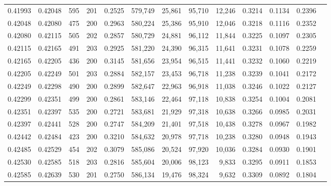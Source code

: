 \begin{tabular}{rrrrrrrrrrrrr}
0.41993 & 0.42048 &   595 & 201 &                                     0.2525 & 579,749 &  25,861 &  95,710 &  12,246 & 0.3214 & 0.1134 & 0.2396 \\
0.42048 & 0.42080 &   475 & 200 &                                     0.2963 & 580,224 &  25,386 &  95,910 &  12,046 & 0.3218 & 0.1116 & 0.2352 \\
0.42080 & 0.42115 &   505 & 202 &                                     0.2857 & 580,729 &  24,881 &  96,112 &  11,844 & 0.3225 & 0.1097 & 0.2305 \\
0.42115 & 0.42165 &   491 & 203 &                                     0.2925 & 581,220 &  24,390 &  96,315 &  11,641 & 0.3231 & 0.1078 & 0.2259 \\
0.42165 & 0.42205 &   436 & 200 &                                     0.3145 & 581,656 &  23,954 &  96,515 &  11,441 & 0.3232 & 0.1060 & 0.2219 \\
0.42205 & 0.42249 &   501 & 203 &                                     0.2884 & 582,157 &  23,453 &  96,718 &  11,238 & 0.3239 & 0.1041 & 0.2172 \\
0.42249 & 0.42298 &   490 & 200 &                                     0.2899 & 582,647 &  22,963 &  96,918 &  11,038 & 0.3246 & 0.1022 & 0.2127 \\
0.42299 & 0.42351 &   499 & 200 &                                     0.2861 & 583,146 &  22,464 &  97,118 &  10,838 & 0.3254 & 0.1004 & 0.2081 \\
0.42351 & 0.42397 &   535 & 200 &                                     0.2721 & 583,681 &  21,929 &  97,318 &  10,638 & 0.3266 & 0.0985 & 0.2031 \\
0.42397 & 0.42441 &   528 & 200 &                                     0.2747 & 584,209 &  21,401 &  97,518 &  10,438 & 0.3278 & 0.0967 & 0.1982 \\
0.42442 & 0.42484 &   423 & 200 &                                     0.3210 & 584,632 &  20,978 &  97,718 &  10,238 & 0.3280 & 0.0948 & 0.1943 \\
0.42485 & 0.42529 &   454 & 202 &                                     0.3079 & 585,086 &  20,524 &  97,920 &  10,036 & 0.3284 & 0.0930 & 0.1901 \\
0.42530 & 0.42585 &   518 & 203 &                                     0.2816 & 585,604 &  20,006 &  98,123 &   9,833 & 0.3295 & 0.0911 & 0.1853 \\
0.42585 & 0.42639 &   530 & 201 &                                     0.2750 & 586,134 &  19,476 &  98,324 &   9,632 & 0.3309 & 0.0892 & 0.1804 \\

\end{tabular}
